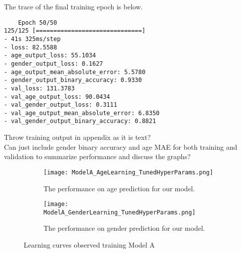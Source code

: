 The trace of the final training epoch is below.\\
\begin{verbatim}
    Epoch 50/50
125/125 [==============================] 
- 41s 325ms/step 
- loss: 82.5588 
- age_output_loss: 55.1034 
- gender_output_loss: 0.1627 
- age_output_mean_absolute_error: 5.5780 
- gender_output_binary_accuracy: 0.9330 
- val_loss: 131.3783 
- val_age_output_loss: 90.0434 
- val_gender_output_loss: 0.3111 
- val_age_output_mean_absolute_error: 6.8350 
- val_gender_output_binary_accuracy: 0.8821
\end{verbatim}
\begin{notes}
    Throw training output in appendix as it is text?\\
    Can just include gender binary accuracy and age MAE for both training and validation to summarize performance and discuss the graphs?
\end{notes}
\begin{figure}[h]
    \centering
    \begin{subfigure}{\textwidth}
        \texttt{[image: ModelA\_AgeLearning\_TunedHyperParams.png]}
        \caption{\label{fig:ModelAPerformanceAge} The performance on age prediction for our model.}
    \end{subfigure}
    \begin{subfigure}{\textwidth}
        \texttt{[image: ModelA\_GenderLearning\_TunedHyperParams.png]}
        \caption{\label{fig:ModelAPerformanceGender} The performance on gender prediction for our model.}
    \end{subfigure}
    \label{fig:ModelAPerformance}
    \caption{Learning curves observed training Model A}
\end{figure}
